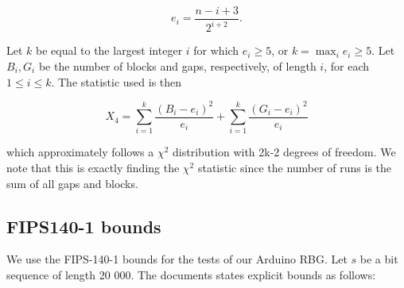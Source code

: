 \documentclass[a4paper]{article}           %
\begin{document}
\[
e_i = \frac{n-i+3}{2^{i+2}}.
\]

Let $k$ be equal to the largest integer $i$ for which $e_i \geq 5$, or $k = \max_i e_i \geq 5$. Let $B_i, G_i$ be the number of blocks and gaps, respectively, of length $i$, for each $ 1 \leq i \leq k$. The statistic used is then

\begin{equation}
X_4 = \sum_{i=1}^k \frac{(B_i - e_i)^2}{e_i} + \sum_{i=1}^k \frac{(G_i - e_i)^2}{e_i}
\end{equation}

which approximately follows a $\chi^2$ distribution with 2k-2 degrees of freedom. We note that this is exactly finding the $\chi^2$ statistic since the number of runs is the sum of all gaps and blocks. 

\subsection{FIPS140-1 bounds}

We use the FIPS-140-1 bounds\cite{fips140} for the tests of our Arduino RBG. Let $s$ be a bit sequence of length 20 000. The documents states explicit bounds as follows:
\end{document}
